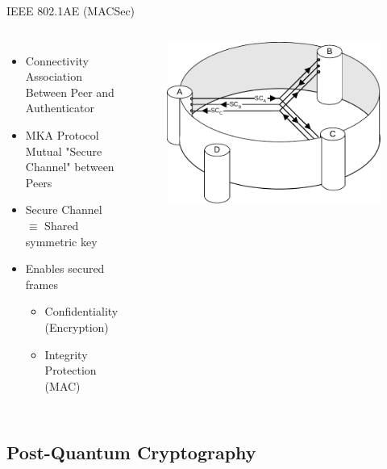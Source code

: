 \documentclass[fleqn,compress,utf8,aspectratio=169,t]{beamer}
\begin{document}
\begin{frame}{IEEE 802.1AE (MACSec)}
  \begin{columns}[T]
    \begin{itemize}
      \item Connectivity Association\\
      Between Peer and Authenticator
      \item<2-> MKA Protocol \\
      Mutual "Secure Channel" between Peers
      \item<3-> Secure Channel $\equiv$ Shared symmetric key
      \item<4-> Enables secured frames
      \begin{itemize}
        \item Confidentiality (Encryption)\\
        \item Integrity Protection (MAC)
      \end{itemize}
    \end{itemize}
      \begin{figure}[t]
        \includegraphics[trim={0 0 0 2}, width=1\columnwidth]{8021ae_fig_7_6_ca.pdf}
    \end{figure}
  \end{columns}
\end{frame}
\fi

\subsection{Post-Quantum Cryptography}
\end{document}
